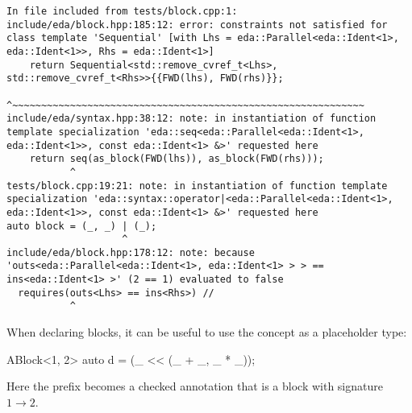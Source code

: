 \begin{verbatim}
In file included from tests/block.cpp:1:
include/eda/block.hpp:185:12: error: constraints not satisfied for class template 'Sequential' [with Lhs = eda::Parallel<eda::Ident<1>, eda::Ident<1>>, Rhs = eda::Ident<1>]
    return Sequential<std::remove_cvref_t<Lhs>, std::remove_cvref_t<Rhs>>{{FWD(lhs), FWD(rhs)}};
           ^~~~~~~~~~~~~~~~~~~~~~~~~~~~~~~~~~~~~~~~~~~~~~~~~~~~~~~~~~~~~~
include/eda/syntax.hpp:38:12: note: in instantiation of function template specialization 'eda::seq<eda::Parallel<eda::Ident<1>, eda::Ident<1>>, const eda::Ident<1> &>' requested here
    return seq(as_block(FWD(lhs)), as_block(FWD(rhs)));
           ^
tests/block.cpp:19:21: note: in instantiation of function template specialization 'eda::syntax::operator|<eda::Parallel<eda::Ident<1>, eda::Ident<1>>, const eda::Ident<1> &>' requested here
auto block = (_, _) | (_);
                    ^
include/eda/block.hpp:178:12: note: because 'outs<eda::Parallel<eda::Ident<1>, eda::Ident<1> > > == ins<eda::Ident<1> >' (2 == 1) evaluated to false
  requires(outs<Lhs> == ins<Rhs>) //
           ^
\end{verbatim}


When declaring blocks, it can be useful to use the  concept as a placeholder type:

\begin{cppcodenl}
  ABlock<1, 2> auto d = (_ << (_ + _, _ * _));
\end{cppcodenl}

Here the  prefix becomes a checked annotation that  is a block with signature $1 \rightarrow 2$.
